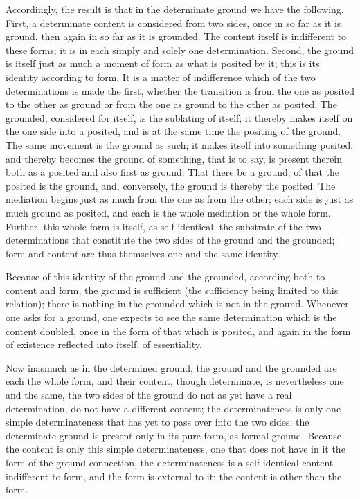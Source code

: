 Accordingly, the result is that
in the determinate ground we have the following.
First, a determinate content is considered from two sides,
once in so far as it is ground,
then again in so far as it is grounded.
The content itself is indifferent to these forms;
it is in each simply and solely one determination.
Second, the ground is itself just as much a moment of form
as what is posited by it; this is its identity according to form.
It is a matter of indifference which of
the two determinations is made the first,
whether the transition is
from the one as posited to the other as ground
or from the one as ground to the other as posited.
The grounded, considered for itself, is the sublating of itself;
it thereby makes itself on the one side into a posited,
and is at the same time the positing of the ground.
The same movement is the ground as such;
it makes itself into something posited,
and thereby becomes the ground of something,
that is to say, is present therein
both as a posited and also first as ground.
That there be a ground, of that the posited is the ground,
and, conversely, the ground is thereby the posited.
The mediation begins just as much from the one as from the other;
each side is just as much ground as posited,
and each is the whole mediation or the whole form.
Further, this whole form is itself, as self-identical,
the substrate of the two determinations
that constitute the two sides of the ground and the grounded;
form and content are thus themselves one and the same identity.

Because of this identity of the ground and the grounded,
according both to content and form,
the ground is sufficient
(the sufficiency being limited to this relation);
there is nothing in the grounded which is not in the ground.
Whenever one asks for a ground,
one expects to see the same determination
which is the content doubled,
once in the form of that which is posited,
and again in the form of existence
reflected into itself, of essentiality.

Now inasmuch as in the determined ground,
the ground and the grounded are each the whole form, and their content,
though determinate, is nevertheless one and the same,
the two sides of the ground do not as yet have a real determination,
do not have a different content;
the determinateness is only one simple determinateness
that has yet to pass over into the two sides;
the determinate ground is present
only in its pure form, as formal ground.
Because the content is only this simple determinateness,
one that does not have in it the form of the ground-connection,
the determinateness is a self-identical content indifferent to form,
and the form is external to it;
the content is other than the form.

